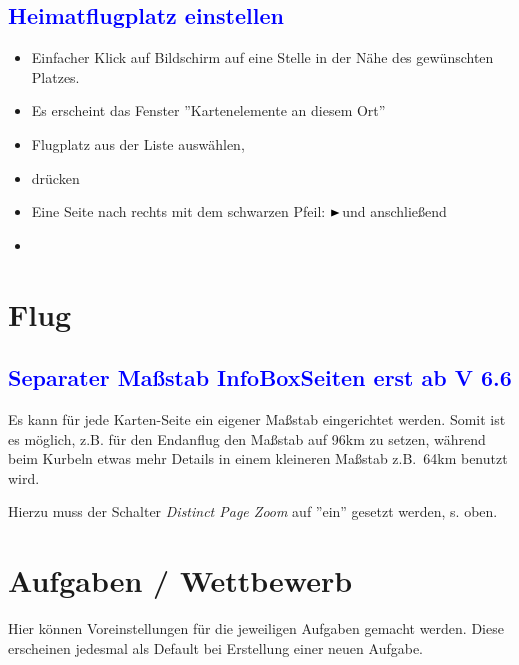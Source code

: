 \subsection*{\textcolor{blue}{Heimatflugplatz einstellen}}
\begin{itemize}
\item Einfacher Klick auf Bildschirm auf eine Stelle in der Nähe des gewünschten Platzes.
\item Es erscheint das Fenster ''Kartenelemente an diesem Ort''
\item Flugplatz aus der Liste auswählen,
\item {} drücken
\item Eine Seite nach rechts mit dem schwarzen Pfeil: \quad${\Huge\RHD}$\quad und anschließend
\item {}
\end{itemize}
\newpage\section{Flug}
\subsection*{\textcolor{blue}{Separater Maßstab InfoBoxSeiten erst ab V 6.6}}
\bc\sk\blink{}\blink{}\blink{}\ec

Es kann für jede Karten-Seite ein eigener Maßstab eingerichtet werden. Somit ist es möglich, z.B. für den Endanflug den Maßstab auf
96km zu setzen, während beim Kurbeln etwas mehr Details in einem kleineren Maßstab z.B.\  64km benutzt wird.

Hierzu muss der Schalter \textit{Distinct Page Zoom} auf ''ein'' gesetzt werden, s. oben.
\newpage\section{Aufgaben / Wettbewerb}
Hier können Voreinstellungen für die jeweiligen Aufgaben gemacht werden. Diese erscheinen
jedesmal als Default bei Erstellung einer neuen Aufgabe.

